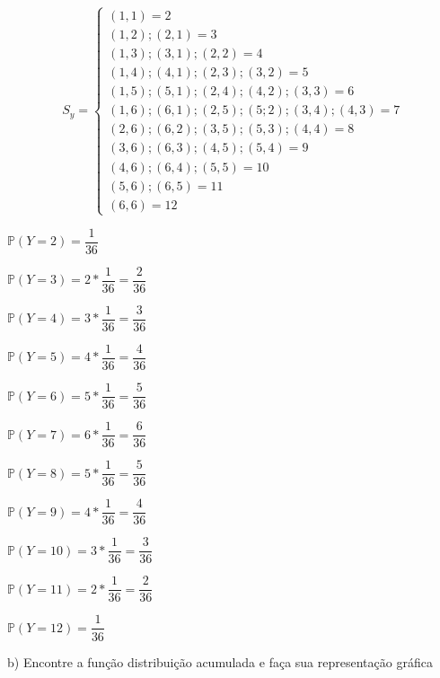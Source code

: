 \documentclass[12pt,a4paper]{article}
\begin{document}
\[
S_{y} =
\begin{cases}
(1,1) = 2 \\
(1,2);(2,1) = 3\\
(1,3);(3,1);(2,2) = 4\\
(1,4);(4,1);(2,3);(3,2) = 5\\
(1,5);(5,1);(2,4);(4,2);(3,3) = 6\\
(1,6);(6,1);(2,5);(5;2);(3,4);(4,3) = 7\\
(2,6);(6,2);(3,5);(5,3);(4,4) = 8\\
(3,6);(6,3);(4,5);(5,4) = 9\\
(4,6);(6,4);(5,5) = 10\\
(5,6);(6,5) = 11\\
(6,6) = 12
\end{cases}
\]
\begin{center}
	\vspace{0.5cm}
	$\mathbb{P}(Y=2) = \dfrac{1}{36}$
	
	\vspace{0.5cm}
	$\mathbb{P}(Y=3) = 2*\dfrac{1}{36} = \dfrac{2}{36}$
	
	\vspace{0.5cm}
	$\mathbb{P}(Y=4) = 3*\dfrac{1}{36} = \dfrac{3}{36}$
	
	\vspace{0.5cm}
	$\mathbb{P}(Y=5) = 4*\dfrac{1}{36} = \dfrac{4}{36}$
	
	\vspace{0.5cm}
	$\mathbb{P}(Y=6) = 5*\dfrac{1}{36} = \dfrac{5}{36}$
	
	\vspace{0.5cm}
	$\mathbb{P}(Y=7) = 6*\dfrac{1}{36} = \dfrac{6}{36}$
	
	\vspace{0.5cm}
	$\mathbb{P}(Y=8) = 5*\dfrac{1}{36} = \dfrac{5}{36}$
	
	\vspace{0.5cm}
	$\mathbb{P}(Y=9) = 4*\dfrac{1}{36} = \dfrac{4}{36}$
	
	\vspace{0.5cm}
	$\mathbb{P}(Y=10) = 3*\dfrac{1}{36} = \dfrac{3}{36}$
	
	\vspace{0.5cm}
	$\mathbb{P}(Y=11) = 2*\dfrac{1}{36} = \dfrac{2}{36}$
	
	\vspace{0.5cm}
	$\mathbb{P}(Y=12) = \dfrac{1}{36}$
\end{center}

\vspace{1cm}
b) Encontre a função distribuição acumulada e faça sua representação gráfica
\end{document}

